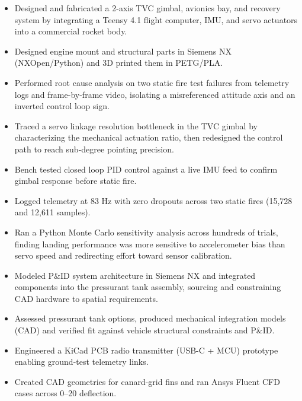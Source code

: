 \begin{itemize}
  \item Designed and fabricated a 2-axis TVC gimbal, avionics bay, and recovery system by integrating a Teensy 4.1 flight computer, IMU, and servo actuators into a commercial rocket body.
  \item Designed engine mount and structural parts in Siemens NX (NXOpen/Python) and 3D printed them in PETG/PLA.
  \item Performed root cause analysis on two static fire test failures from telemetry logs and frame-by-frame video, isolating a misreferenced attitude axis and an inverted control loop sign.
  \item Traced a servo linkage resolution bottleneck in the TVC gimbal by characterizing the mechanical actuation ratio, then redesigned the control path to reach sub-degree pointing precision.
  \item Bench tested closed loop PID control against a live IMU feed to confirm gimbal response before static fire.
  \item Logged telemetry at 83 Hz with zero dropouts across two static fires (15,728 and 12,611 samples).
  \item Ran a Python Monte Carlo sensitivity analysis across hundreds of trials, finding landing performance was more sensitive to accelerometer bias than servo speed and redirecting effort toward sensor calibration.
\end{itemize}
\entrygap

\begin{itemize}
  \item Modeled P\&ID system architecture in Siemens NX and integrated components into the pressurant tank assembly, sourcing and constraining CAD hardware to spatial requirements.
  \item Assessed pressurant tank options, produced mechanical integration models (CAD) and verified fit against vehicle structural constraints and P\&ID.
  \item Engineered a KiCad PCB radio transmitter (USB-C + MCU) prototype enabling ground-test telemetry links.
  \item Created CAD geometries for canard-grid fins and ran Ansys Fluent CFD cases across 0--20\textdegree{} deflection.
\end{itemize}
\entrygap

